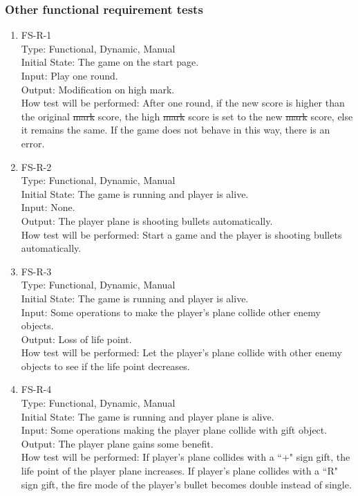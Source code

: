 \documentclass[12pt, titlepage]{article}
\begin{document}
\subsubsection{Other functional requirement tests}
\begin{enumerate}
\item {FS-R-1\\}
Type: Functional, Dynamic, Manual\\
Initial State: The game on the start page.\\
Input: Play one round.\\
Output: Modification on high mark.\\
How test will be performed: After one round, if the new score is higher than the original \sout{mark} {\color{red} score}, the high \sout{mark} {\color{red} score} is set to the new \sout{mark} {\color{red} score}, else it remains the same. If the game does not behave in this way, there is an error.
\item {FS-R-2\\}
Type: Functional, Dynamic, Manual\\
Initial State: The game is running and player is alive.\\
Input: None.\\
Output: The player plane is shooting bullets automatically.\\
How test will be performed: Start a game and the player is shooting bullets automatically. 


\item {FS-R-3\\}
Type: Functional, Dynamic, Manual\\
Initial State: The game is running and player is alive.\\
Input: Some operations to make the player's plane collide other enemy objects.\\
Output: Loss of life point.\\
How test will be performed: Let the player's plane collide with other enemy objects to see if the life point decreases.
\item {FS-R-4\\}
Type: Functional, Dynamic, Manual\\
Initial State: The game is running and player plane is alive.\\
Input: Some operations making the player plane collide with gift object.\\
Output: The player plane gains some benefit.\\
How test will be performed: If player's plane collides with a ``+" sign gift, the life point of the player plane increases. If player's plane collides with a ``R" sign gift, the fire mode of the player's bullet becomes double instead of single.
\end{enumerate}
\end{document}
